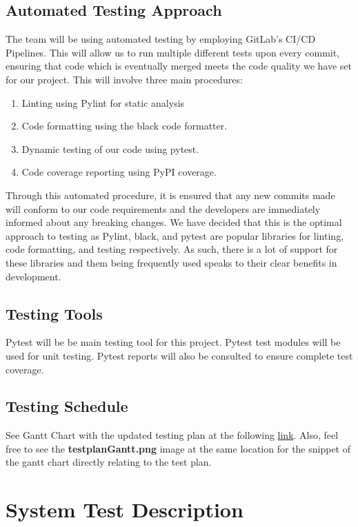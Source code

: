 \documentclass[12pt, titlepage]{article}
\begin{document}
\subsection{Automated Testing Approach}
The team will be using automated testing by employing GitLab's CI/CD Pipelines. This will allow us to run multiple different tests upon every commit, ensuring that code which is eventually merged meets the code quality we have set for our project. This will involve three main procedures:
\begin{enumerate}
    \item Linting using Pylint for static analysis
    \item Code formatting using the black code formatter.
    \item Dynamic testing of our code using pytest.
    \item Code coverage reporting using PyPI coverage.
\end{enumerate}

Through this automated procedure, it is ensured that any new commits made will conform to our code requirements and the developers are immediately informed about any breaking changes. We have decided that this is the optimal approach to testing as Pylint, black, and pytest are popular libraries for linting, code formatting, and testing respectively. As such, there is a lot of support for these libraries and them being frequently used speaks to their clear benefits in development.
\subsection{Testing Tools}

Pytest will be be main testing tool for this project. Pytest test modules will be used for unit testing. Pytest reports will also be consulted to ensure complete test coverage.

\subsection{Testing Schedule}

See Gantt Chart with the updated testing plan at the following \href{https://gitlab.cas.mcmaster.ca/modyj/3xa3/-/tree/master/ProjectSchedule}{link}.
Also, feel free to see the \textbf{testplanGantt.png} image at the same location for the snippet of the gantt chart directly relating to the test plan.

\section{System Test Description}
\end{document}
